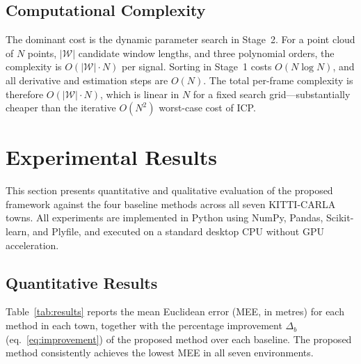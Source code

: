 \documentclass[lettersize,journal]{IEEEtran}
\begin{document}
\subsection{Computational Complexity}

The dominant cost is the dynamic parameter search in Stage~2. For a point cloud
of $N$ points, $|\mathcal{W}|$ candidate window lengths, and three polynomial
orders, the complexity is $O(|\mathcal{W}| \cdot N)$ per signal. Sorting in
Stage~1 costs $O(N \log N)$, and all derivative and estimation steps are $O(N)$.
The total per-frame complexity is therefore $O(|\mathcal{W}| \cdot N)$, which is
linear in $N$ for a fixed search grid---substantially cheaper than the iterative
$O(N^2)$ worst-case cost of ICP.

\section{Experimental Results}\label{sec:results}

This section presents quantitative and qualitative evaluation of the proposed
framework against the four baseline methods across all seven KITTI-CARLA towns.
All experiments are implemented in Python using NumPy, Pandas, Scikit-learn,
and Plyfile, and executed on a standard desktop CPU without GPU acceleration.

\subsection{Quantitative Results}

Table~\ref{tab:results} reports the mean Euclidean error (MEE, in metres) for
each method in each town, together with the percentage improvement
$\Delta_b$ (eq.~\eqref{eq:improvement}) of the proposed method over each
baseline. The proposed method consistently achieves the lowest MEE in all
seven environments.
\end{document}
